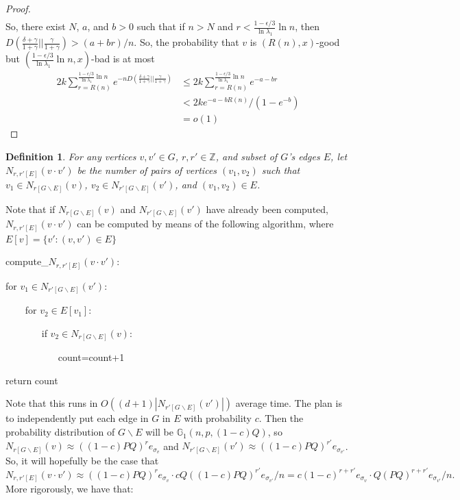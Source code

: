 \documentclass[11pt]{article}
\newcommand{\gss}{\mathbb{G}_1}
\newcommand{\1}{\mathbb{1}}
\newtheorem{definition}{Definition}
\begin{document}
\begin{proof}
\begin{align*}
\end{align*}
So, there exist $N$, $a$, and $b>0$ such that if $n>N$ and $r<\frac{1-\epsilon/3}{\ln\lambda_1}\ln n$, then $D(\frac{\delta+\gamma}{1+\gamma}||\frac{\gamma}{1+\gamma})>(a+br)/n$. So, the probability that $v$ is $(R(n),x)$-good but $(\frac{1-\epsilon/3}{\ln\lambda_1}\ln n,x)$-bad is at most 
\begin{align*}
2k\sum_{r=R(n)}^{\frac{1-\epsilon/3}{\ln\lambda_1}\ln n} e^{-nD(\frac{\delta+\gamma}{1+\gamma}||\frac{\gamma}{1+\gamma})}&\le2k\sum_{r=R(n)}^{\frac{1-\epsilon/3}{\ln\lambda_1}\ln n} e^{-a-br}\\
&<2ke^{-a-bR(n)}/(1-e^{-b})\\
&=o(1)
\end{align*}
\end{proof}

\begin{definition}
For any vertices $v, v'\in G$, $r,r'\in \mathbb{Z}$, and subset of $G$'s edges $E$, let $N_{r,r'[E]}(v\cdot v')$ be the number of pairs of vertices $(v_1,v_2)$ such that $v_1\in N_{r[G\backslash E]}(v)$, $v_2\in N_{r'[G\backslash E]}(v')$, and $(v_1,v_2)\in E$.
\end{definition}

Note that if $N_{r[G\backslash E]}(v)$ and $N_{r'[G\backslash E]}(v')$ have already been computed, $N_{r,r'[E]}(v\cdot v')$ can be computed by means of the following algorithm, where $E[v]=\{v':(v,v')\in E\}$
\begin{algorithm}
compute\_$N_{r,r'[E]}(v\cdot v')$:

for $v_1\in N_{r'[G\backslash E]}(v')$:

$\phantom{xxx}$ for $v_2\in E[v_1]:$

$\phantom{xxxxxx}$ if $v_2\in N_{r[G\backslash E]}(v):$

$\phantom{xxxxxxxxx}$ count=count+1

return count
\end{algorithm}

Note that this runs in $O((d+1)|N_{r'[G\backslash E]}(v')|)$ average time. The plan is to independently put each edge in $G$ in $E$ with probability $c$. Then the probability distribution of $G\backslash E$ will be $\gss(n,p,(1-c)Q)$, so $N_{r[G\backslash E]}(v)\approx ((1-c)PQ)^re_{\sigma_v}$ and $N_{r'[G\backslash E]}(v')\approx ((1-c)PQ)^{r'}e_{\sigma_{v'}}$. So, it will hopefully be the case that \[N_{r,r'[E]}(v\cdot v')\approx ((1-c)PQ)^re_{\sigma_v}\cdot cQ((1-c)PQ)^{r'}e_{\sigma_{v'}}/n= c(1-c)^{r+r'} e_{\sigma_v}\cdot Q(PQ)^{r+r'}e_{\sigma_{v'}}/n.\] More rigorously, we have that:
\end{document}
